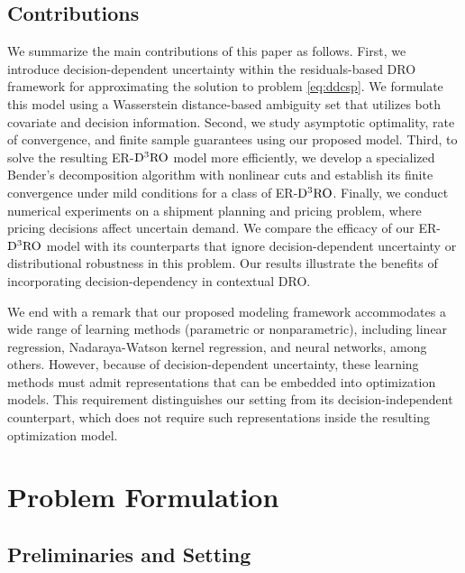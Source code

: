 \documentclass[onefignum,onetabnum]{siamart251216}
\begin{document}
\subsection{Contributions}
We summarize the main contributions of this paper as follows. First, we introduce decision-dependent uncertainty within the residuals-based DRO framework for approximating the solution to problem \eqref{eq:ddcsp}. We formulate this model using a Wasserstein distance-based ambiguity set that utilizes both covariate and decision information. Second, we study asymptotic optimality, rate of convergence, and finite sample guarantees using our proposed model. Third, to solve the resulting ER-$\rm{D^3RO}$ model more efficiently, we develop a specialized Bender's decomposition algorithm with nonlinear cuts and establish its finite convergence under mild conditions for a class of ER-$\rm{D^3RO}$. Finally, we conduct numerical experiments on a shipment planning and pricing problem, where pricing decisions affect uncertain demand. We compare the efficacy of our ER-$\rm{D^3RO}$ model with its counterparts that ignore decision-dependent uncertainty or distributional robustness in this problem. Our results illustrate the benefits of incorporating decision-dependency in contextual DRO.  

We end with a remark that our proposed modeling framework accommodates a wide range of learning methods (parametric or nonparametric), including linear regression, Nadaraya-Watson kernel regression, and neural networks, among others. However, because of decision-dependent uncertainty, these learning methods must admit representations that can be embedded into optimization models. 
This requirement distinguishes our setting from its decision-independent counterpart, which does not require such representations inside the resulting optimization model. 


\section{Problem Formulation}\label{sec:background}

\subsection{Preliminaries and Setting}\label{sec:preliminary}
\end{document}
